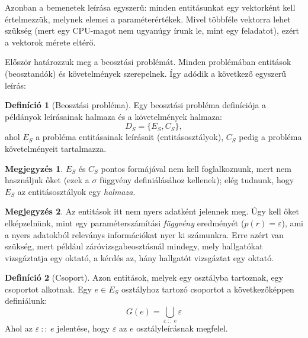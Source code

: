 \documentclass{article}
\theoremstyle{definition}
\newtheorem{definition}{Definíció}[section]
\newtheorem*{megj}{Megjegyzés}
\newcommand{\set}[1]{ \{ {#1} \} }
\begin{document}
\begin{multicols}{2}
    Azonban a bemenetek leírása egyszerű: minden entitásunkat egy vektorként kell értelmezzük, melynek elemei a paraméterértékek. Mivel többféle vektorra lehet szükség (mert egy CPU-magot nem ugyanúgy írunk le, mint egy feladatot), ezért a vektorok mérete eltérő.
    
    Először határozzuk meg a beosztási problémát. Minden problémában entitások (beosztandók) és követelmények szerepelnek. Így adódik a következő egyszerű leírás:
    
    \begin{definition}[Beosztási probléma]\label{def:problema}
        Egy beosztási probléma definíciója a példányok leírásainak halmaza és a követelmények halmaza:
        \begin{equation}
            D_S = \set{E_S, C_S},
        \end{equation}
        ahol $E_S$ a probléma entitásainak leírásait (entitásosztályok), $C_S$ pedig a probléma követelményeit tartalmazza.
        \begin{megj}
            $E_S$ és $C_S$ pontos formájával nem kell foglalkoznunk, mert nem használjuk őket (ezek a $\sigma$ függvény definiálásához kellenek); elég tudnunk, hogy $E_S$ az entitásosztályok egy {\it halmaza}.
        \end{megj}
        \begin{megj} \label{megj:param_func}
            Az entitások itt nem nyers adatként jelennek meg. Úgy kell őket elképzelnünk, mint egy paraméterszámítási {\it függvény} eredményét ($p(r) = \varepsilon$), ami a nyers adatokból releványs információkat nyer ki számunkra. Erre azért van szükség, mert például záróvizsgabeosztásnál mindegy, mely hallgatókat vizsgáztatja egy oktató, a kérdés az, hány hallgatót vizsgáztat egy oktató.
        \end{megj}
    \end{definition}
    
    \begin{definition}[Csoport]
        Azon entitások, melyek egy osztályba tartoznak, egy csoportot alkotnak. Egy $e \in E_S$ osztályhoz tartozó csoportot a következőképpen definiálunk:
        \begin{equation}
            G(e) = \bigcup_{\varepsilon \ :: \ e} \varepsilon
        \end{equation}
        Ahol az $\varepsilon \ :: \ e$ jelentése, hogy $\varepsilon$ az $e$ osztályleírásnak megfelel. 
    \end{definition}
    

\end{multicols}
\end{document}
